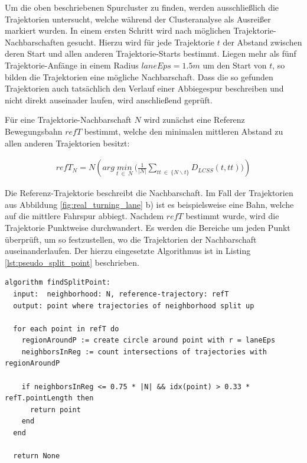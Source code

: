 Um die oben beschriebenen Spurcluster zu finden, werden ausschließlich die Trajektorien untersucht,
welche während der Clusteranalyse als Ausreißer markiert wurden.
In einem ersten Schritt wird nach möglichen Trajektorie-Nachbarschaften gesucht. Hierzu wird für
jede Trajektorie $t$ der Abstand zwischen deren Start und allen anderen Trajektorie-Starts bestimmt.
Liegen mehr als fünf Trajektorie-Anfänge in einem Radius $laneEps = 1.5m$ um den Start von $t$, so bilden
die Trajektorien eine mögliche Nachbarschaft.
Dass die so gefunden Trajektorien auch tatsächlich den Verlauf einer Abbiegespur beschreiben und nicht
direkt auseinader laufen, wird anschließend geprüft.

Für eine Trajektorie-Nachbarschaft $N$ wird zunächst eine Referenz Bewegungsbahn $refT$ bestimmt, welche den
minimalen mittleren Abstand zu allen anderen Trajektorien besitzt:

\begin{ceqn}
\begin{align}
    refT_N = N(arg\ \underset{t\ \in\ N}{min}\ \Big(\frac{1}{|N|} \sum_{tt\ \in\ \{N \backslash t\}} D_{LCSS}(t, tt) \Big))
\end{align}
\end{ceqn}

Die Referenz-Trajektorie beschreibt die Nachbarschaft. Im Fall der Trajektorien aus Abbildung
\ref{fig:real_turning_lane} b) ist es beispielsweise eine Bahn, welche auf die mittlere Fahrspur abbiegt.
Nachdem $refT$ bestimmt wurde, wird die Trajektorie Punktweise durchwandert. Es werden die Bereiche um jeden
Punkt überprüft, um so festzustellen, wo die Trajektorien der Nachbarschaft auseinanderlaufen. Der hierzu
eingesetzte Algorithmus ist in Listing \ref{lst:pseudo_split_point} beschrieben.
\begin{lstlisting}[caption=Pseudocode Split-Punkt Bestimmung, language=Pseudo, label=lst:pseudo_split_point]
algorithm findSplitPoint:
  input:  neighborhood: N, reference-trajectory: refT
  output: point where trajectories of neighborhood split up

  for each point in refT do
    regionAroundP := create circle around point with r = laneEps
    neighborsInReg := count intersections of trajectories with regionAroundP

    if neighborsInReg <= 0.75 * |N| && idx(point) > 0.33 * refT.pointLength then
      return point
    end
  end

  return None
\end{lstlisting}

